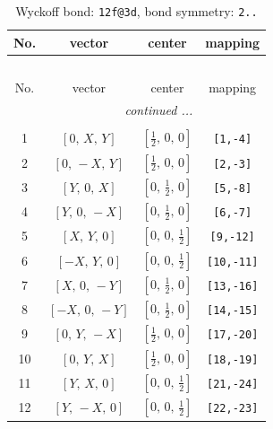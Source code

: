 \documentclass[fleqn,8pt]{jsarticle}
\begin{document}
\renewcommand{\arraystretch}{1.2}
\begin{longtable}{cccc}
\caption{Wyckoff bond: {\tt 12f@3d}, bond symmetry: {\tt 2..}}
 \\
 \hline \hline
No. & vector & center & mapping \\ \hline \endfirsthead

\multicolumn{3}{l}{\tablename\ \thetable{}} \\
 \hline \hline
No. & vector & center & mapping \\ \hline \endhead

 \hline \hline
\multicolumn{3}{r}{\footnotesize\it continued ...} \\ \endfoot

 \hline \hline
\multicolumn{3}{r}{} \\ \endlastfoot

1 & $\left[ 0,\, X,\, Y \right]$ & $\left[ \frac{1}{2},\, 0,\, 0 \right]$ & {\tt [1,-4]} \\ \hline
2 & $\left[ 0,\, - X,\, Y \right]$ & $\left[ \frac{1}{2},\, 0,\, 0 \right]$ & {\tt [2,-3]} \\ \hline
3 & $\left[ Y,\, 0,\, X \right]$ & $\left[ 0,\, \frac{1}{2},\, 0 \right]$ & {\tt [5,-8]} \\ \hline
4 & $\left[ Y,\, 0,\, - X \right]$ & $\left[ 0,\, \frac{1}{2},\, 0 \right]$ & {\tt [6,-7]} \\ \hline
5 & $\left[ X,\, Y,\, 0 \right]$ & $\left[ 0,\, 0,\, \frac{1}{2} \right]$ & {\tt [9,-12]} \\ \hline
6 & $\left[ - X,\, Y,\, 0 \right]$ & $\left[ 0,\, 0,\, \frac{1}{2} \right]$ & {\tt [10,-11]} \\ \hline
7 & $\left[ X,\, 0,\, - Y \right]$ & $\left[ 0,\, \frac{1}{2},\, 0 \right]$ & {\tt [13,-16]} \\ \hline
8 & $\left[ - X,\, 0,\, - Y \right]$ & $\left[ 0,\, \frac{1}{2},\, 0 \right]$ & {\tt [14,-15]} \\ \hline
9 & $\left[ 0,\, Y,\, - X \right]$ & $\left[ \frac{1}{2},\, 0,\, 0 \right]$ & {\tt [17,-20]} \\ \hline
10 & $\left[ 0,\, Y,\, X \right]$ & $\left[ \frac{1}{2},\, 0,\, 0 \right]$ & {\tt [18,-19]} \\ \hline
11 & $\left[ Y,\, X,\, 0 \right]$ & $\left[ 0,\, 0,\, \frac{1}{2} \right]$ & {\tt [21,-24]} \\ \hline
12 & $\left[ Y,\, - X,\, 0 \right]$ & $\left[ 0,\, 0,\, \frac{1}{2} \right]$ & {\tt [22,-23]} \\
\end{longtable}
\end{document}

